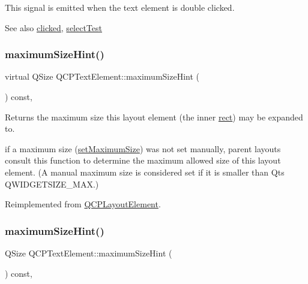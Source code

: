 This signal is emitted when the text element is double clicked.

\begin{DoxySeeAlso}{See also}
\hyperlink{class_q_c_p_text_element_ad2246a0e701c0655623f048737298334}{clicked}, \hyperlink{class_q_c_p_text_element_a1e721bc2994a127ef5a8f0a514a5dbac}{select\+Test} 
\end{DoxySeeAlso}
\mbox{\label{class_q_c_p_text_element_a174551b248c8960d1b250bbe04e1b20c}} 
\subsubsection{\texorpdfstring{maximum\+Size\+Hint()}{maximumSizeHint()}\hspace{0.1cm}{\footnotesize\ttfamily [1/2]}}
{\footnotesize\ttfamily virtual Q\+Size Q\+C\+P\+Text\+Element\+::maximum\+Size\+Hint (\begin{DoxyParamCaption}{ }\end{DoxyParamCaption}) const\hspace{0.3cm}{\ttfamily [protected]}, {\ttfamily [virtual]}}

Returns the maximum size this layout element (the inner \hyperlink{class_q_c_p_layout_element_a208effccfe2cca4a0eaf9393e60f2dd4}{rect}) may be expanded to.

if a maximum size (\hyperlink{class_q_c_p_layout_element_a74eb5280a737ab44833d506db65efd95}{set\+Maximum\+Size}) was not set manually, parent layouts consult this function to determine the maximum allowed size of this layout element. (A manual maximum size is considered set if it is smaller than Qt\textquotesingle{}s Q\+W\+I\+D\+G\+E\+T\+S\+I\+Z\+E\+\_\+\+M\+AX.) 

Reimplemented from \hyperlink{class_q_c_p_layout_element_ab5ce2ba22b36d9a3b70a1be562c326e5}{Q\+C\+P\+Layout\+Element}.

\mbox{\label{class_q_c_p_text_element_a65e5f4c5a852bbff48acef236048354f}} 
\subsubsection{\texorpdfstring{maximum\+Size\+Hint()}{maximumSizeHint()}\hspace{0.1cm}{\footnotesize\ttfamily [2/2]}}
{\footnotesize\ttfamily Q\+Size Q\+C\+P\+Text\+Element\+::maximum\+Size\+Hint (\begin{DoxyParamCaption}{ }\end{DoxyParamCaption}) const\hspace{0.3cm}{\ttfamily [protected]}, {\ttfamily [virtual]}}

